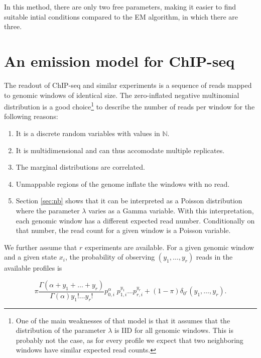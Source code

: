 \documentclass[12pt]{article}
\begin{document}
\begin{appendices}
    In this method, there are only two free parameters, making
    it easier to find suitable intial conditions compared to
    the EM algorithm, in which there are three.

    
\section{An emission model for ChIP-seq}

    The readout of ChIP-seq and similar experiments is a sequence of
    reads mapped to genomic windows of identical size.
    The zero-inflated negative multinomial distribution is a good
    choice\footnote{One
    of the main weaknesses of that model is that it
    assumes that the distribution of the parameter $\lambda$ is IID
    for all genomic windows. This is probably not the case, as for
    every profile we expect that two neighboring windows have similar
    expected read counts.} to describe
    the number of reads per window for the following reasons:

    \begin{enumerate}
      \item It is a discrete random variables with values in
        $\mathbb{N}$.
      \item It is multidimensional and can thus accomodate multiple
        replicates.
      \item The marginal distributions are correlated.
      \item Unmappable regions of the genome inflate the windows
        with no read.
      \item Section \ref{sec:nb} shows that it can be interpreted
        as a Poisson distribution where the parameter $\lambda$
        varies as a Gamma variable. With this interpretation, each
        genomic window has a different expected read number.
        Conditionally on that number, the read count for a given
        window is a Poisson variable.
    \end{enumerate}

    We further assume that $r$ experiments are available.
    For a given genomic window and a given state $x_i$, the
    probability of observing $(y_1, \ldots, y_r)$ reads in the
    available profiles is

    \begin{equation*}
      \pi \frac{\Gamma(\alpha+y_1+\ldots+y_r)}
      {\Gamma(\alpha)y_1! \ldots y_r!}
      p_{0,i}^{\alpha} \; p_{1,i}^{y_1} \ldots p_{r,i}^{y_r}
      + (1-\pi) \delta_{0^r}(y_1, \ldots, y_r).
    \end{equation*}


\end{appendices}
\end{document}

